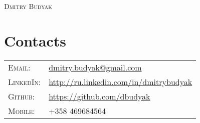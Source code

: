 \documentclass[a4paper,11pt]{article}
\begin{document}
\pagestyle{empty}
\par{\centering
	\Large \textsc{Dmitry Budyak}
	}\bigskip\par

\section{Contacts}
	\begin{tabular}{ll}
	\textsc{Email:}     	& \href{mailto:dmitry.budyak@gmail.com}{dmitry.budyak@gmail.com} \\
	\textsc{LinkedIn:} 	& \href{http://ru.linkedin.com/in/dmitrybudyak}{http://ru.linkedin.com/in/dmitrybudyak} \\
	\textsc{Github:}	& \href{https://github.com/dbudyak}{https://github.com/dbudyak} \\
	\textsc{Mobile:}     	& +358 469684564
	\end{tabular}
\end{document}
